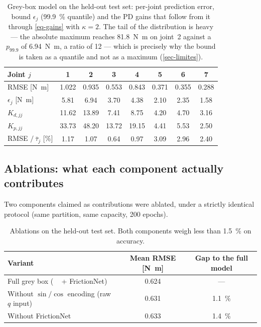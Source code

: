 \documentclass[a4paper, oneside]{article}
\newcommand{\code}[1]{%
    \mbox{\ttfamily\small%
        \detokenize{#1}%
    }%
}
\newcommand{\q}{\ensuremath{q}}
\begin{document}
\begin{table}[htbp]
\centering
\caption{Grey-box model on the held-out test set: per-joint prediction error,
bound $\epsilon_j$ (\SI{99.9}{\percent} quantile) and the PD gains that follow
from it through \cref{eq-gains} with $\kappa = 2$. The tail of the distribution
is heavy --- the absolute maximum reaches \SI{81.8}{\newton\meter} on joint~2
against a $p_{99.9}$ of \SI{6.94}{\newton\meter}, a ratio of \num{12} --- which
is precisely why the bound is taken as a quantile and not as a maximum
(\cref{sec-limites}).}
\label{tab-perjoint}
\small
\begin{tabular}{@{}lccccccc@{}}
\toprule
Joint $j$ & 1 & 2 & 3 & 4 & 5 & 6 & 7 \\
\midrule
RMSE [\si{\newton\meter}] & \num{1.022} & \num{0.935} & \num{0.553} & \num{0.843}
& \num{0.371} & \num{0.355} & \num{0.288} \\
$\epsilon_j$ [\si{\newton\meter}] & \num{5.81} & \num{6.94} & \num{3.70} & \num{4.38}
& \num{2.10} & \num{2.35} & \num{1.58} \\
$K_{d,jj}$ & \num{11.62} & \num{13.89} & \num{7.41} & \num{8.75}
& \num{4.20} & \num{4.70} & \num{3.16} \\
$K_{p,jj}$ & \num{33.73} & \num{48.20} & \num{13.72} & \num{19.15}
& \num{4.41} & \num{5.53} & \num{2.50} \\
\midrule
RMSE $/\ \bar{\tau}_j$ [\si{\percent}] & \num{1.17} & \num{1.07} & \num{0.64} & \num{0.97}
& \num{3.09} & \num{2.96} & \num{2.40} \\
\bottomrule
\end{tabular}
\end{table}

\subsection{Ablations: what each component actually contributes}
\label{sec-res-ablations}

Two components claimed as contributions were ablated, under a strictly
identical protocol (same partition, same capacity, \num{200} epochs).

\begin{table}[htbp]
\centering
\caption{Ablations on the held-out test set. Both components weigh less than
\SI{1.5}{\percent} on accuracy.}
\label{tab-ablations}
\small
\begin{tabular}{@{}lcc@{}}
\toprule
Variant & Mean RMSE [\si{\newton\meter}] & Gap to the full model \\
\midrule
Full grey box (\code{sincos} + FrictionNet) & \num{0.624} & --- \\
Without $\sin/\cos$ encoding (raw $\q$ input) & \num{0.631} & \SI{+1.1}{\percent} \\
Without FrictionNet & \num{0.633} & \SI{+1.4}{\percent} \\
\bottomrule
\end{tabular}
\end{table}
\end{document}
